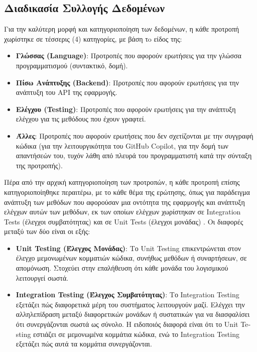   \subsection{Διαδικασία Συλλογής Δεδομένων}

  Για την καλύτερη μορφή και κατηγοριοποίηση των δεδομένων, η κάθε
  προτροπή χωρίστηκε σε τέσσερις (4) κατηγορίες, με βάση τo είδος της:

  \begin{itemize}
    \item
      \textbf{Γλώσσας (\textlatin{Language})}: Προτροπές που αφορούν
      ερωτήσεις για την γλώσσα προγραμματισμού (συντακτικό, δομή).
    \item
      \textbf{Πίσω Ανάπτυξης (\textlatin{Backend})}: Προτροπές που αφορούν
      ερωτήσεις για την ανάπτυξη του \textlatin{API} της εφαρμογής.
    \item
      \textbf{Ελέγχου (\textlatin{Testing})}: Προτροπές που αφορούν
      ερωτήσεις για την ανάπτυξη ελέγχου για τις μεθόδους που έχουν γραφτεί.
    \item
      \textbf{Άλλες}: Προτροπές που αφορούν ερωτήσεις που δεν σχετίζονται με
      την συγγραφή κώδικα (για την λειτουργικότητα του \textlatin{GitHub
        Copilot}, για την δομή των απαντήσεών του, τυχόν λάθη από πλευρά του
      προγραμματιστή κατά την σύνταξη της προτροπής).
  \end{itemize}

  Πέρα από την αρχική κατηγοριοποίηση των προτροπών, η κάθε προτροπή
  επίσης κατηγοριοποίηθηκε περαιτέρω, με το κάθε θέμα της ερώτησης, όπως
  για παράδειγμα ανάπτυξη των μεθόδων που αφορούσαν μια οντότητα της
  εφαρμογής και ανάπτυξη ελέγχων αυτών των μεθόδων, εκ των οποίων ελέγχων
  χωρίστηκαν σε \textlatin{Integration Tests} (έλεγχοι συμβατότητας) και
  σε \textlatin{Unit Tests} (έλεγχοι μονάδας) \cite{jamilTesting,
  Kathiriya}. Οι διαφορές μεταξύ των δύο είναι οι εξής:
  \begin{itemize}
    \item
      \textbf{\textlatin{Unit Testing} (Έλεγχος Μονάδας)}: Το
      \textlatin{Unit Testing} επικεντρώνεται στον έλεγχο μεμονωμένων
      κομματιών κώδικα, συνήθως μεθόδων ή συναρτήσεων, σε απομόνωση.
      Στοχεύει στην επαλήθευση ότι κάθε μονάδα του λογισμικού λειτουργεί
      σωστά.
    \item
      \textbf{\textlatin{Integration Testing} (Έλεγχος Συμβατότητας)}: Το
      \textlatin{Integration Testing} εξετάζει πώς διαφορετικά μέρη του
      συστήματος λειτουργούν μαζί. Ελέγχει την αλληλεπίδραση μεταξύ
      διαφορετικών μονάδων ή συστατικών για να διασφαλίσει ότι συνεργάζονται
      σωστά ως σύνολο. Η ειδοποιός διαφορά είναι ότι το \textlatin{Unit
      Testing} εστιάζει σε μεμονωμένα κομμάτια κώδικα, ενώ το
      \textlatin{Integration Testing} εξετάζει πώς αυτά τα κομμάτια
      συνεργάζονται. \cite{patton2005software}
  \end{itemize}

